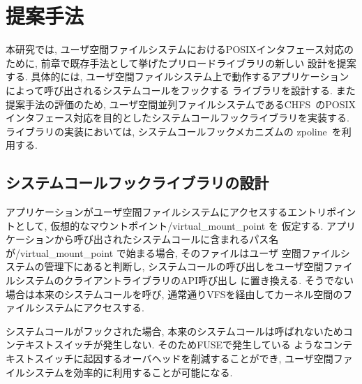 \documentclass[a4paper,11pt]{jreport}
\begin{document}
\chapter{提案手法}
本研究では, ユーザ空間ファイルシステムにおけるPOSIXインタフェース対応のために, 前章で既存手法として挙げたプリロードライブラリの新しい
設計を提案する. 具体的には, ユーザ空間ファイルシステム上で動作するアプリケーションによって呼び出されるシステムコールをフックする
ライブラリを設計する. また提案手法の評価のため, ユーザ空間並列ファイルシステムであるCHFS~\cite{tatebe2022chfs}のPOSIX
インタフェース対応を目的としたシステムコールフックライブラリを実装する. ライブラリの実装においては, システムコールフックメカニズムの
zpoline~\cite{288689}を利用する.


\section{システムコールフックライブラリの設計}
アプリケーションがユーザ空間ファイルシステムにアクセスするエントリポイントとして, 仮想的なマウントポイント/virtual\_mount\_point を
仮定する. アプリケーションから呼び出されたシステムコールに含まれるパス名が/virtual\_mount\_point で始まる場合, そのファイルはユーザ
空間ファイルシステムの管理下にあると判断し, システムコールの呼び出しをユーザ空間ファイルシステムのクライアントライブラリのAPI呼び出し
に置き換える. そうでない場合は本来のシステムコールを呼び, 通常通りVFSを経由してカーネル空間のファイルシステムにアクセスする.

システムコールがフックされた場合, 本来のシステムコールは呼ばれないためコンテキストスイッチが発生しない. そのためFUSEで発生している
ようなコンテキストスイッチに起因するオーバヘッドを削減することができ, ユーザ空間ファイルシステムを効率的に利用することが可能になる.
\end{document}

